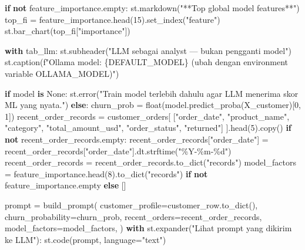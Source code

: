 \documentclass[
  indonesian,
  letterpaper,
  DIV=11,
  numbers=noendperiod]{scrreprt}
\newenvironment{Shaded}{\begin{snugshade}}{\end{snugshade}}
\newcommand{\BuiltInTok}[1]{\textcolor[rgb]{0.00,0.23,0.31}{#1}}
\newcommand{\ControlFlowTok}[1]{\textcolor[rgb]{0.00,0.23,0.31}{\textbf{#1}}}
\newcommand{\DecValTok}[1]{\textcolor[rgb]{0.68,0.00,0.00}{#1}}
\newcommand{\KeywordTok}[1]{\textcolor[rgb]{0.00,0.23,0.31}{\textbf{#1}}}
\newcommand{\NormalTok}[1]{\textcolor[rgb]{0.00,0.23,0.31}{#1}}
\newcommand{\OperatorTok}[1]{\textcolor[rgb]{0.37,0.37,0.37}{#1}}
\newcommand{\SpecialCharTok}[1]{\textcolor[rgb]{0.37,0.37,0.37}{#1}}
\newcommand{\SpecialStringTok}[1]{\textcolor[rgb]{0.13,0.47,0.30}{#1}}
\newcommand{\StringTok}[1]{\textcolor[rgb]{0.13,0.47,0.30}{#1}}
\newcommand{\VariableTok}[1]{\textcolor[rgb]{0.07,0.07,0.07}{#1}}
\begin{document}
\begin{Shaded}
\begin{Highlighting}[]
        \ControlFlowTok{if} \KeywordTok{not}\NormalTok{ feature\_importance.empty:}
\NormalTok{            st.markdown(}\StringTok{"**Top global model features**"}\NormalTok{)}
\NormalTok{            top\_fi }\OperatorTok{=}\NormalTok{ feature\_importance.head(}\DecValTok{15}\NormalTok{).set\_index(}\StringTok{"feature"}\NormalTok{)}
\NormalTok{            st.bar\_chart(top\_fi[}\StringTok{"importance"}\NormalTok{])}

\ControlFlowTok{with}\NormalTok{ tab\_llm:}
\NormalTok{    st.subheader(}\StringTok{"LLM sebagai analyst — bukan pengganti model"}\NormalTok{)}
\NormalTok{    st.caption(}\SpecialStringTok{f"Ollama model: }\SpecialCharTok{\{}\NormalTok{DEFAULT\_MODEL}\SpecialCharTok{\}}\SpecialStringTok{ (ubah dengan environment variable OLLAMA\_MODEL)"}\NormalTok{)}

    \ControlFlowTok{if}\NormalTok{ model }\KeywordTok{is} \VariableTok{None}\NormalTok{:}
\NormalTok{        st.error(}\StringTok{"Train model terlebih dahulu agar LLM menerima skor ML yang nyata."}\NormalTok{)}
    \ControlFlowTok{else}\NormalTok{:}
\NormalTok{        churn\_prob }\OperatorTok{=} \BuiltInTok{float}\NormalTok{(model.predict\_proba(X\_customer)[}\DecValTok{0}\NormalTok{, }\DecValTok{1}\NormalTok{])}
\NormalTok{        recent\_order\_records }\OperatorTok{=}\NormalTok{ customer\_orders[}
\NormalTok{            [}\StringTok{"order\_date"}\NormalTok{, }\StringTok{"product\_name"}\NormalTok{, }\StringTok{"category"}\NormalTok{, }\StringTok{"total\_amount\_usd"}\NormalTok{, }\StringTok{"order\_status"}\NormalTok{, }\StringTok{"returned"}\NormalTok{]}
\NormalTok{        ].head(}\DecValTok{5}\NormalTok{).copy()}
        \ControlFlowTok{if} \KeywordTok{not}\NormalTok{ recent\_order\_records.empty:}
\NormalTok{            recent\_order\_records[}\StringTok{"order\_date"}\NormalTok{] }\OperatorTok{=}\NormalTok{ recent\_order\_records[}\StringTok{"order\_date"}\NormalTok{].dt.strftime(}\StringTok{"\%Y{-}\%m{-}}\SpecialCharTok{\%d}\StringTok{"}\NormalTok{)}
\NormalTok{        recent\_order\_records }\OperatorTok{=}\NormalTok{ recent\_order\_records.to\_dict(}\StringTok{"records"}\NormalTok{)}
\NormalTok{        model\_factors }\OperatorTok{=}\NormalTok{ feature\_importance.head(}\DecValTok{8}\NormalTok{).to\_dict(}\StringTok{"records"}\NormalTok{) }\ControlFlowTok{if} \KeywordTok{not}\NormalTok{ feature\_importance.empty }\ControlFlowTok{else}\NormalTok{ []}

\NormalTok{        prompt }\OperatorTok{=}\NormalTok{ build\_prompt(}
\NormalTok{            customer\_profile}\OperatorTok{=}\NormalTok{customer\_row.to\_dict(),}
\NormalTok{            churn\_probability}\OperatorTok{=}\NormalTok{churn\_prob,}
\NormalTok{            recent\_orders}\OperatorTok{=}\NormalTok{recent\_order\_records,}
\NormalTok{            model\_factors}\OperatorTok{=}\NormalTok{model\_factors,}
\NormalTok{        )}
        \ControlFlowTok{with}\NormalTok{ st.expander(}\StringTok{"Lihat prompt yang dikirim ke LLM"}\NormalTok{):}
\NormalTok{            st.code(prompt, language}\OperatorTok{=}\StringTok{"text"}\NormalTok{)}


\end{Highlighting}
\end{Shaded}
\end{document}
